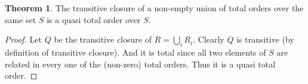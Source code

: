\documentclass[12pt]{article}
\theoremstyle{definition}
\theoremstyle{theorem}
\newtheorem{theorem}{Theorem}[section]
\begin{document}
\begin{theorem}
  The transitive closure of a non-empty union of total orders over the
  same set $S$ is a
  quasi total order over $S$.
\end{theorem}
\begin{proof}
  Let \( Q \) be the transitive closure of \(R = \bigcup_i R_i\).  Clearly
  $Q$ is transitive (by definition of transitive closure).  And it is
  total since all two elements of $S$ are related in every one of the
  (non-zero) total orders.  Thus it is a quasi total order.
\end{proof}
\end{document}
